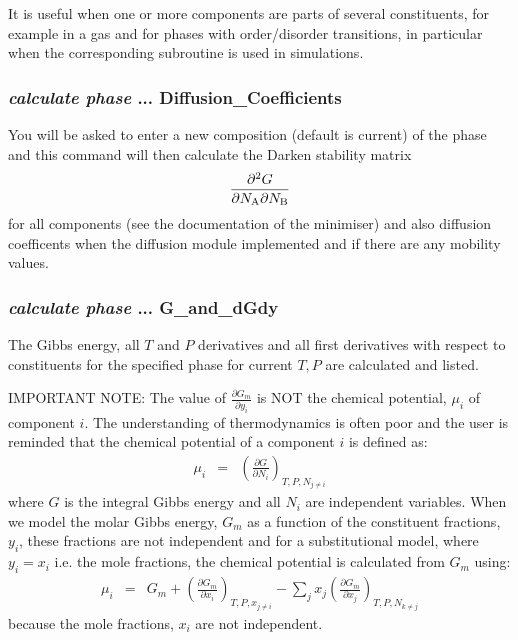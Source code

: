\documentclass[11pt]{article}
\begin{document}
It is useful when one or more components are parts of several
constituents, for example in a gas and for phases with order/disorder
transitions, in particular when the corresponding subroutine is used
in simulations.

\hypertarget{Calculate phase ... diffusion-coeff}{}
\subsubsection{{\em calculate phase} ... Diffusion\_Coefficients}\label{sc:darken}

You will be asked to enter a new composition (default is current) of
the phase and this command will then calculate the Darken stability
matrix
\begin{eqnarray*}
  \frac{\partial^2 G}{\partial N_{\rm A}\partial N_{\rm B}}
\end{eqnarray*}
for all components (see the documentation of the minimiser) and also
diffusion coefficents when the diffusion module implemented and if
there are any mobility values.

\hypertarget{calculate phase ... G-and-dGdy}{}
\subsubsection{{\em calculate phase} ... G\_and\_dGdy}

The Gibbs energy, all $T$ and $P$ derivatives and all first derivatives
with respect to constituents for the specified phase for current $T,P$
are calculated and listed.

IMPORTANT NOTE: The value of $\frac{\partial G_m}{\partial y_i}$ is
NOT the chemical potential, $\mu_i$ of component $i$.  The
understanding of thermodynamics is often poor and the user is reminded
that the chemical potential of a component $i$ is defined as:
\begin{eqnarray*}
\mu_i &=& \left(\frac{\partial G}{\partial N_i}\right)_{T,P,N_{j\ne i}}
\end{eqnarray*}
where $G$ is the integral Gibbs energy and all $N_i$ are independent
variables.  When we model the molar Gibbs energy, $G_m$ as a function
of the constituent fractions, $y_i$, these fractions are not
independent and for a substitutional model, where $y_i=x_i$ i.e. the
mole fractions, the chemical potential is calculated from $G_m$ using:
\begin{eqnarray*}
  \mu_i &=& G_m + \left(\frac{\partial G_m}{\partial x_i}\right)_{T,P,x_{j\ne i}}
  - \sum_j x_j \left(\frac{\partial G_m}{\partial x_j}\right)_{T,P,N_{k\ne j}}
\end{eqnarray*}
because the mole fractions, $x_i$ are not independent.
\end{document}
